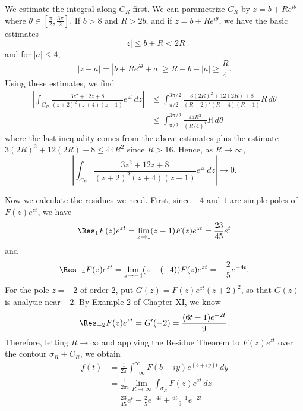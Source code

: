 \documentclass[11pt]{book}
\theoremstyle{definition}
\begin{document}
\begin{enumerate}
    We estimate the integral along $C_R$ first.  We can parametrize $C_R$ by $z = b + Re^{i\theta}$ where $\theta\in [\tfrac \pi 2, \tfrac{3\pi}{2} ]$.  If $b > 8$ and $R>2b$, and if $z  = b + Re^{i\theta}$, we have the basic estimates
    \[ |z| \leq b + R < 2R \] and for $|a|\leq 4$, 
    \[ |z+a| = |b+Re^{i\theta} + a| \geq R - b- |a| \geq \frac{R}{4} .\]  Using these estimates, we find
    \begin{align*}
      \left| \int_{C_R} \frac{3z^2+12z+8}{(z+2)^2 (z+4) (z-1)} e^{zt} \, dz \right|  &\leq  \int_{\pi/2}^{3\pi /2} \frac{3(2R)^2 + 12(2R) + 8}{(R-2)^2 (R-4) (R-1)} R \, d\theta\\
      &\leq \int_{\pi / 2}^{3\pi/2} \frac{44R^2}{(R/4)^4} R \, d\theta 
    \end{align*}
    where the last inequality comes from the above estimates plus the estimate $3(2R)^2 + 12(2R) + 8 \leq 44 R^2$ since $R>16$.  Hence, as $R\to \infty$, 
    \[ \left| \int_{C_R} \frac{3z^2+12z+8}{(z+2)^2 (z+4) (z-1)} e^{zt} \, dz \right|  \to 0. \] 

    Now we calculate the residues we need.  First, since $-4$ and $1$ are simple poles of $F(z)e^{zt}$, we have 
    \[ \Res_1 F(z) e^{zt} = \lim_{z\to 1} (z-1) F(z) e^{zt} = \frac{23}{45}e^t \] 
    and 
    \[ \Res_{-4} F(z)e^{zt} = \lim_{z\to -4} (z - (-4)) F(z)e^{zt} = -\frac{2}{5} e^{-4t}. \]   For the pole  $z=-2$ of order $2$, put $G(z) = F(z) e^{zt} (z+2)^2$, so that $G(z)$ is analytic near $-2$.  By Example 2 of Chapter XI, we know 
    \[ \Res_{-2} F(z) e^{zt} = G'(-2) = \frac{(6t-1)e^{-2t}}{9}. \]  Therefore,  letting $R\to \infty$ and applying the Residue Theorem to $F(z)e^{zt}$ over the contour $\sigma_R + C_R$, we obtain
    \begin{align*}
      f(t) &= \frac{1}{2\pi} \int_{-\infty}^\infty F(b+iy) e^{(b+iy)t} \, dy  \\    
      &= \frac{1}{2\pi i} \lim_{R\to \infty} \int_{\sigma_R} F(z) e^{zt} \, dz \\
        &=    \frac{23}{45}e^t - \frac{2}{5} e^{-4t} + \frac{6t-1}{9} e^{-2t} 
      \end{align*}
    


\end{enumerate}
\end{document}
